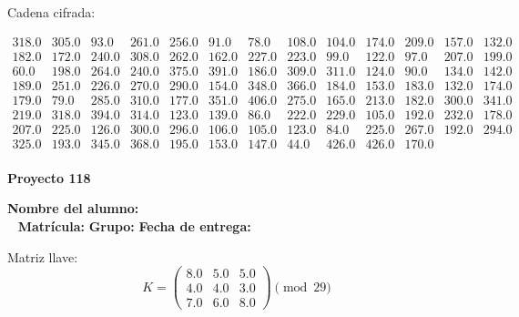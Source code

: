 \documentclass[12pt]{article}
\begin{document}
Cadena cifrada:
\begin{center}
$\begin{array}{lllllllllllll}
318.0 & 305.0 & 93.0 & 261.0 & 256.0 & 91.0 & 78.0 & 108.0 & 104.0 & 174.0 & 209.0 & 157.0 & 132.0\\
182.0 & 172.0 & 240.0 & 308.0 & 262.0 & 162.0 & 227.0 & 223.0 & 99.0 & 122.0 & 97.0 & 207.0 & 199.0\\
60.0 & 198.0 & 264.0 & 240.0 & 375.0 & 391.0 & 186.0 & 309.0 & 311.0 & 124.0 & 90.0 & 134.0 & 142.0\\
189.0 & 251.0 & 226.0 & 270.0 & 290.0 & 154.0 & 348.0 & 366.0 & 184.0 & 153.0 & 183.0 & 132.0 & 174.0\\
179.0 & 79.0 & 285.0 & 310.0 & 177.0 & 351.0 & 406.0 & 275.0 & 165.0 & 213.0 & 182.0 & 300.0 & 341.0\\
219.0 & 318.0 & 394.0 & 314.0 & 123.0 & 139.0 & 86.0 & 222.0 & 229.0 & 105.0 & 192.0 & 232.0 & 178.0\\
207.0 & 225.0 & 126.0 & 300.0 & 296.0 & 106.0 & 105.0 & 123.0 & 84.0 & 225.0 & 267.0 & 192.0 & 294.0\\
325.0 & 193.0 & 345.0 & 368.0 & 195.0 & 153.0 & 147.0 & 44.0 & 426.0 & 426.0 & 170.0\\
\end{array}$
\end{center}

\newpage


\textbf{Proyecto 118}

\textbf{Nombre del alumno:} \underline{\hspace{13cm}}\\\
\vspace{1cm}
\textbf{Matrícula:} \underline{\hspace{4cm}} \hspace{1cm}
\textbf{Grupo:} \underline{\hspace{2cm}}
\textbf{Fecha de entrega:} \underline{\hspace{2cm}}

\medskip

Matriz llave:
\[
K = \begin{pmatrix}
8.0 & 5.0 & 5.0\\
4.0 & 4.0 & 3.0\\
7.0 & 6.0 & 8.0
\end{pmatrix} \pmod{29}
\]
\end{document}
